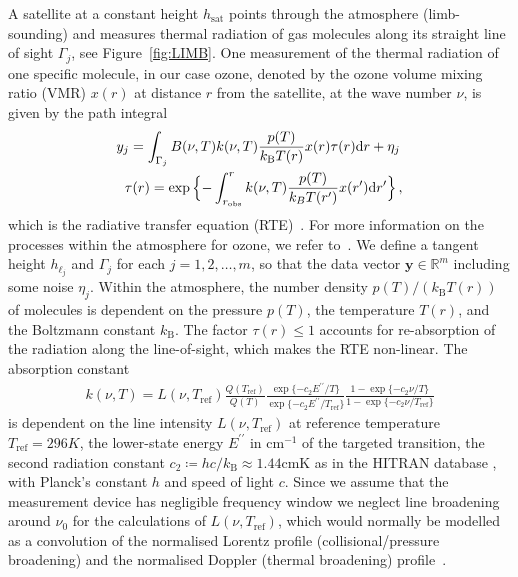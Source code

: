 A satellite at a constant height $h_{\text{sat}}$ points through the atmosphere (limb-sounding) and measures thermal radiation of gas molecules along its straight line of sight $\Gamma_j$, see  Figure~\ref{fig:LIMB}.
One measurement of the thermal radiation of one specific molecule, in our case ozone, denoted by the ozone volume mixing ratio (VMR) $x(r)$ at distance $r$ from the satellite, at the wave number $\nu$, is given by the path integral
\begin{align}
	\label{eq:RTE} 
	y_j =   \int_{\Gamma_j}  B(\nu,T) k(\nu, T)   \frac{p(T)}{k_{\text{B}} T(r)}  x(r)  \tau(r) \text{d}r + \eta_j \, \\
	\tau(r) = \exp{ \Bigl\{ - \int^{r}_{r_\text{obs}}  k(\nu, T)   \frac{p(T)}{k_B T(r^{\prime})}  x(r^{\prime}) \text{d}r^{\prime} \Bigr\} } \, ,\label{eq:absRTE} 
\end{align}
which is the radiative transfer equation (RTE)~\cite{mipas2000handbook}.
For more information on the processes within the atmosphere for ozone, we refer to~\cite{Lee2020NightOzone}.
We define a tangent height $h_{\ell_j}$ and $\Gamma_j$ for each $j=1,2,\ldots,m$, so that the data vector $\bm{y} \in \mathbb{R}^m$ including some noise $\eta_j$.
Within the atmosphere, the number density $p(T) / (k_{\text{B}} T(r))$ of molecules is dependent on the pressure $p(T)$, the temperature $T(r)$, and the Boltzmann constant $k_{\text{B}}$.
The factor $\tau(r)\leq 1$ accounts for re-absorption of the radiation along the line-of-sight, which makes the RTE non-linear.
The absorption constant
\begin{align}
	k(\nu, T) = L(\nu, T_{\text{ref}}) \frac{Q(T_{\text{ref}})}{Q(T)} \frac{ \exp{\{ - c_2 E^{\prime \prime} / T\}} }{\exp{\{ - c_2 E^{\prime \prime} / T_{\text{ref}} \}}} \frac{ 1- \exp{\{ - c_2 \nu  / T \}} }{1 - \exp{\{ - c_2 \nu / T_{\text{ref}} \}}}
\end{align}
is dependent on the line intensity $L(\nu, T_{\text{ref}})$ at reference temperature $T_{\text{ref}} =296K $, the lower-state energy $ E^{\prime \prime} $ in $\text{cm}^{-1}$ of the targeted transition, the second radiation constant $c_2\coloneqq hc/k_{\text{B}} \approx 1.44\text{cmK}$ as in the HITRAN database \cite{gordon2022hitran2020}, with Planck's constant $h$ and speed of light $c$.
Since we assume that the measurement device has negligible frequency window we neglect line broadening around $\nu_0$ for the calculations of $L(\nu, T_{\text{ref}})$, which would normally be modelled as a convolution of the normalised Lorentz profile (collisional/pressure broadening) and the normalised Doppler (thermal broadening) profile~\cite{mipas2000handbook}.
